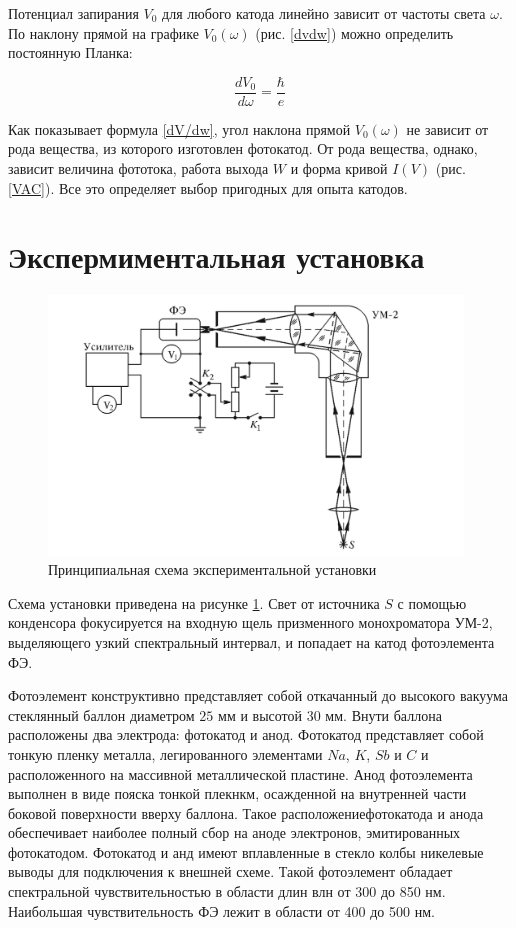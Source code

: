 \documentclass[15pt,a5paper,reqno]{article}
\begin{document}
	Потенциал запирания $ V_0 $ для любого катода линейно зависит от
	частоты света $ \omega $. По наклону прямой на графике $ V_0(\omega) $ (рис. \ref{dvdw}) можно определить постоянную Планка:
	
	\begin{equation}\label{dV/dw}
		\dfrac{dV_0}{d\omega} = \dfrac{\hbar}{e}
	\end{equation}
	
	Как показывает формула \eqref{dV/dw}, угол наклона прямой $ V_0(\omega) $ не зависит от рода вещества, из которого изготовлен фотокатод. От рода вещества, однако, зависит величина фототока, работа выхода $ W $ и форма кривой $ I(V) $ (рис. \ref{VAC}). Все это определяет выбор пригодных для
	опыта катодов.

	\section{Экспермиментальная установка}

	\begin{figure}[h!]
		\centering
		\includegraphics[width=11cm]{pics/scheme.png}
		\caption{Принципиальная схема экспериментальной установки}
		\label{scheme}
	\end{figure}

	Схема установки приведена на рисунке \ref{scheme}. Свет от источника $S$ с помощью конденсора фокусируется на входную щель
	призменного монохроматора УМ-2, выделяющего узкий спектральный интервал, и попадает на катод фотоэлемента ФЭ. 

	Фотоэлемент конструктивно представляет собой откачанный до высокого вакуума стеклянный баллон диаметром $25$ мм и высотой $30$ мм. 
	Внути баллона расположены два электрода: фотокатод и анод. Фотокатод представляет собой тонкую пленку металла, легированного элементами
	$Na$, $K$, $Sb$ и $C$ и расположенного на массивной металлической пластине. Анод фотоэлемента выполнен в виде пояска тонкой плекнкм, осажденной на внутренней части боковой поверхности вверху баллона.
	Такое расположениефотокатода и анода обеспечивает наиболее полный сбор на аноде электронов, эмитированных фотокатодом. Фотокатод и анд имеют вплавленные в стекло колбы никелевые выводы для подключения к внешней схеме.
	Такой фотоэлемент обладает спектральной чувствительностью в области длин влн от 300 до 850 нм. Наибольшая чувствительность ФЭ лежит в области от 400 до 500 нм. 
\end{document}
